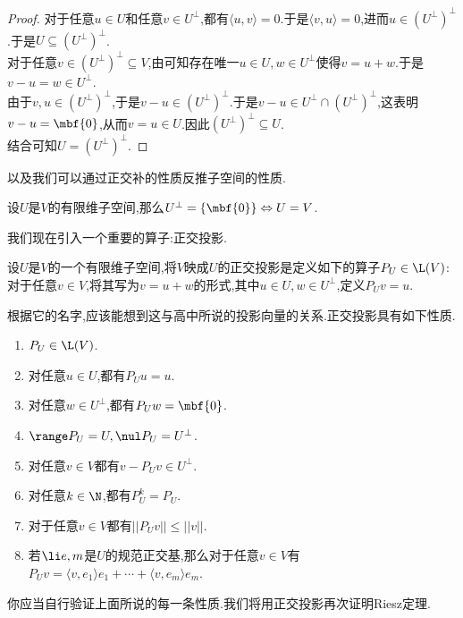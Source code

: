 \documentclass{ctexart}
\begin{document}
\begin{proof}
    对于任意$u\in U$和任意$v\in U^\bot$,都有$\langle u,v\rangle=0$.于是$\langle v,u\rangle=0$,进而$u\in\left(U^\bot\right)^\bot$.于是$U\subseteq\left(U^\bot\right)^\bot$.\\
    对于任意$v\in\left(U^\bot\right)^\bot\subseteq V$,由可知存在唯一$u\in U,w\in U^\bot$使得$v=u+w$.于是$v-u=w\in U^\bot$.\\
    由于$v,u\in\left(U^\bot\right)^\bot$,于是$v-u\in\left(U^\bot\right)^\bot$.于是$v-u\in U^\bot\cap\left(U^\bot\right)^\bot$,这表明$v-u=\mbf{0}$,从而$v=u \in U$.因此$\left(U^\bot\right)^\bot\subseteq U$.\\
    结合可知$U=\left(U^\bot\right)^\bot$.
\end{proof}\noindent
以及我们可以通过正交补的性质反推子空间的性质.
\begin{formal}[1.6 子空间和其正交补的关联]
    设$U$是$V$的有限维子空间,那么$U^\bot=\left\{\mbf{0}\right\}\Leftrightarrow U=V$.
\end{formal}\noindent
我们现在引入一个重要的算子:正交投影.
\begin{definition}[1.7 定义:正交投影]
    设$U$是$V$的一个有限维子空间,将$V$映成$U$的正交投影是定义如下的算子$P_U\in\L(V)$:\\
    对于任意$v\in V$,将其写为$v=u+w$的形式,其中$u\in U,w\in U^\bot$,定义$P_U v=u$.
\end{definition}\noindent
根据它的名字,应该能想到这与高中所说的投影向量的关系.正交投影具有如下性质.
\begin{formal}[1.8 正交投影的性质]
    \begin{enumerate}[label=\tbf{(\arabic*)}]
        \item $P_U\in\L(V)$.
        \item 对任意$u\in U$,都有$P_Uu=u$.
        \item 对任意$w\in U^\bot$,都有$P_Uw=\mbf{0}$.
        \item $\range P_U=U,\nul P_U=U^\bot$.
        \item 对任意$v\in V$都有$v-P_Uv\in U^\bot$.
        \item 对任意$k\in\N$,都有$P^k_U=P_U$.
        \item 对于任意$v\in V$都有$||P_Uv||\leqslant ||v||$.
        \item 若$\li e,m$是$U$的规范正交基,那么对于任意$v\in V$有$P_Uv=\langle v,e_1\rangle e_1+\cdots+\langle v,e_m\rangle e_m$.
    \end{enumerate}
\end{formal}\noindent
你应当自行验证上面所说的每一条性质.我们将用正交投影再次证明Riesz定理.
\end{document}
